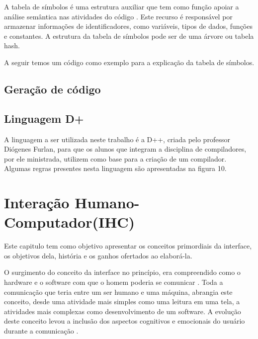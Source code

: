 \documentclass[12pt,oneside,a4paper,chapter=TITLE,section=TITLE,sumario=tradicional]{abntex2}
\begin{document}
A tabela de símbolos é uma estrutura auxiliar que tem como função apoiar a análise semântica nas atividades do código \cite{ricarte2008}. Este recurso é responsável por armazenar informações de identificadores, como variáveis, tipos de dados, funções e constantes. A estrutura da tabela de símbolos pode ser de uma árvore ou tabela hash.

A seguir temos um código como exemplo para a explicação da tabela de símbolos.

\begin{figure}[htb]
\end{figure}

\section{Geração de código}
\label{sec:geracao-de-codigo}

\section{Linguagem D+}
\label{sec:linguagem-d+}

A linguagem a ser utilizada neste trabalho é a D++, criada pelo professor Diógenes Furlan, para que os alunos que integram a disciplina de compiladores, por ele ministrada, utilizem como base para a criação de um compilador. Algumas regras presentes nesta linguagem são apresentadas na figura 10.

\begin{figure}[htb]
\end{figure}

\chapter{Interação Humano-Computador(IHC)}
\label{cap:interacao-humano-computador}

Este capitulo tem como objetivo apresentar os conceitos primordiais da interface, os objetivos dela, história e os ganhos ofertados ao elaborá-la. 

O surgimento do conceito da interface no princípio, era compreendido como o hardware e o software com que o homem poderia se comunicar \cite{rocha2003}.  Toda a comunicação que teria entre um ser humano e uma máquina, abrangia este conceito, desde uma atividade mais simples como uma leitura em uma tela, a atividades mais complexas como desenvolvimento de um software. A evolução deste conceito levou a inclusão dos aspectos cognitivos e emocionais do usuário durante a comunicação \cite{rocha2003}.
\end{document}
